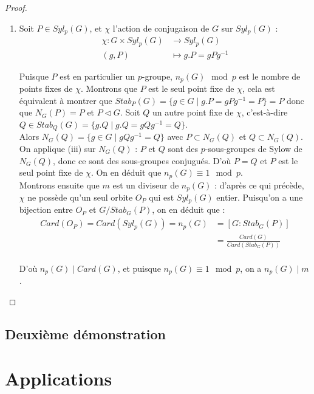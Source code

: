 \documentclass{article}
\theoremstyle{definition}
\theoremstyle{plain}
\theoremstyle{plain}
\theoremstyle{plain}
\theoremstyle{plain}
\theoremstyle{plain}
\theoremstyle{definition}
\theoremstyle{plain}
\theoremstyle{plain}
\begin{document}
\begin{proof}
\begin{enumerate}[label={\upshape(\roman*)}]
\item Soit \( P \in Syl_{p}(G) \), et \( \chi \) l'action de conjugaison de \( G \) sur \( Syl_{p}(G) \) :
\begin{align*}
	\chi : G \times Syl_{p}(G) &\to Syl_{p}(G) \\
	(g,P) &\mapsto g.P = gPg^{-1}
\end{align*}

Puisque \( P \) est en particulier un \(p\)-groupe, \( n_p(G) \mod p \) est le nombre de points fixes de \( \chi \). Montrons que \( P \) est le seul point fixe de \( \chi \), cela est équivalent à montrer que \( Stab_P(G) = \{ g \in G \mid g.P = gPg^{-1} = P \} = P \) donc que \( N_G(P) = P \) et \( P \triangleleft G \). Soit \( Q \) un autre point fixe de \( \chi \), c'est-à-dire \(Q \in Stab_Q(G) = \{g.Q \mid g.Q = gQg^{-1} = Q \}  \). \\
Alors \( N_G(Q) = \{ g \in G \mid gQg^{-1} = Q\} \) avec \( P \subset N_G(Q) \) et \( Q \subset N_G(Q) \). \\
On applique (iii) sur \( N_G(Q) \) : \( P \) et \( Q \) sont des \(p\)-sous-groupes de Sylow de \( N_G(Q) \), donc ce sont des sous-groupes conjugués. D'où \( P = Q \) et \( P \) est le seul point fixe de \( \chi \). On en déduit que \( n_p(G) \equiv 1 \mod p \). \\
Montrons ensuite que \( m \) est un diviseur de \( n_p(G) \) : d'après ce qui précède, \( \chi \) ne possède qu'un seul orbite \( O_P \) qui est \( Syl_p({G}) \) entier. Puisqu'on a une bijection entre \( O_P \) et \( G/Stab_G(P) \), on en déduit que :
\begin{align*}
	Card(O_P)= Card(Syl_p(G)) = n_p(G) &= [G : Stab_G(P) ] \\ 
		 &= \frac{Card(G)}{Card(Stab_G(P))}\\
\end{align*}

D'où \( n_p(G) \mid Card(G) \), et puisque \( n_p(G) \equiv 1\mod p \), on a \( n_p(G) \mid m \).
	\end{enumerate}
\end{proof}


\subsection{Deuxième démonstration}


\clearpage
\section{Applications}
\end{document}
